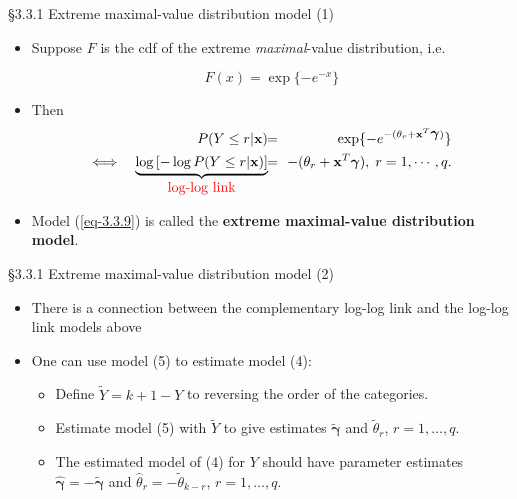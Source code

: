 \documentclass{beamer}
\newcommand{\boldgamma}{{\boldsymbol \gamma}}
\newenvironment{wideitemize}%
  {\begin{itemize}%
    \setlength{\parskip}{1em}}%
  {\end{itemize}}
\begin{document}
\begin{frame}{\large \S3.3.1 Extreme maximal-value distribution model (1)}
\begin{wideitemize}
\item Suppose $F$ is the cdf of the extreme \emph{maximal}-value distribution, i.e.

\[
F(x)=\exp\{-e^{-x}\}
\]
\item Then
\begin{eqnarray}
P(Y\leq r|\textbf{x}) &\!\!=\!\!& \exp\{-e^{-(\theta_r+\textbf{x}^T\mbox{\boldmath $\gamma$})}\}
\label{eq-3.3.9} \\   \Longleftrightarrow \quad
\underbrace{\log\left[-\log P(Y\leq r|\textbf{x})\right]}_{\textcolor{red}{\mbox{log-log link}}}
&\!\!=\!\!& -(\theta_r+\textbf{x}^T\mbox{\boldmath $\gamma$}), \; r=1,\cdots,q.
\label{eq-3.3.10}
\end{eqnarray}

\item
Model (\ref{eq-3.3.9}) is called the \textbf{extreme maximal-value distribution
model}.
\end{wideitemize}
\end{frame}

\begin{frame} {\large \S3.3.1 Extreme maximal-value distribution model (2)}



\begin{wideitemize}
\item There is a connection between the complementary log-log link and the log-log link models above

\item One can use model (5) to estimate model (4):
\begin{wideitemize}
\item Define $\tilde{Y} = k + 1 - Y$ to reversing the order of the categories. 

\item Estimate model (5) with $\tilde{Y}$ to give estimates $\tilde{\boldgamma}$ and $\tilde{\theta}_r$, $r = 1, \dots, q$.
\item The estimated model of (4) for $Y$ should have parameter estimates $\hat{\boldgamma} =- \tilde{\boldgamma}$ and $\hat{\theta}_r = - \tilde{\theta}_{k-r}$, $r =1, \dots, q$.
\end{wideitemize}
\end{wideitemize}

\end{frame}
\end{document}
